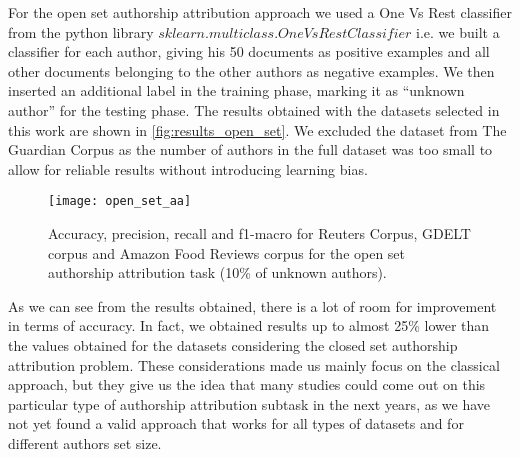 For the open set authorship attribution approach we used a One Vs Rest classifier from the python library $
sklearn.multiclass.OneVsRestClassifier$ i.e. we built a classifier for each author, giving his 50 documents as positive examples and all other documents belonging to the other authors as negative examples.
We then inserted an additional label in the training phase, marking it as \enquote{unknown author} for the testing phase.
The results obtained with the datasets selected in this work are shown in \autoref{fig:results_open_set}. We excluded the dataset from The Guardian Corpus as the number of authors in the full dataset was too small to allow for reliable results without introducing learning bias.

\begin{figure}[ht]
	\centering
	\texttt{[image: open\_set\_aa]}
	\caption[Results of our single topic dataset with open set authorship attribution]{Accuracy, precision, recall and f1-macro for Reuters Corpus, GDELT corpus and Amazon Food Reviews corpus for the open set authorship attribution task (10\% of unknown authors).}
	\label{fig:results_open_set}
\end{figure}

As we can see from the results obtained, there is a lot of room for improvement in terms of accuracy. In fact, we obtained results up to almost 25\% lower than the values obtained for the datasets considering the closed set authorship attribution problem.
These considerations made us mainly focus on the classical approach, but they give us the idea that many studies could come out on this particular type of authorship attribution subtask in the next years, as we have not yet found a valid approach that works for all types of datasets and for different authors set size.